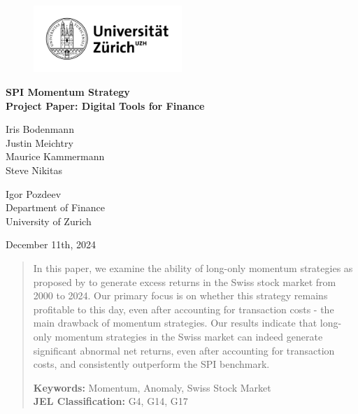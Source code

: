 \documentclass[a4paper,12pt]{article}
\begin{document}
	\begin{titlepage}
		\centering
		\begin{figure}[!h]
			\centering
			\includegraphics[width=0.5\textwidth]{Universität_Zürich_logo.png}
		\end{figure}
		\Large{\textbf{SPI Momentum Strategy \\ Project Paper: Digital Tools for Finance}\\}

		\vfill
		
		\large{Iris Bodenmann\\ Justin Meichtry\\ Maurice Kammermann \\ Steve Nikitas\\}
		
		\vfill
	
		\large{Igor Pozdeev\\Department of Finance\\ University of Zurich\\}

        \vfill
        \large{December 11th, 2024}
	
		\vfill
		\begin{abstract}
            In this paper, we examine the ability of long-only momentum strategies as proposed by \cite{jegatit1993} to generate excess returns in the Swiss stock market from 2000 to 2024. Our primary focus is on whether this strategy remains profitable to this day, even after accounting for transaction costs - the main drawback of momentum strategies. Our results indicate that long-only momentum strategies in the Swiss market can indeed generate significant abnormal net returns, even after accounting for transaction costs, and consistently outperform the SPI benchmark.  
			
			\vspace{2mm}
			
			\textbf{Keywords:} Momentum, Anomaly, Swiss Stock Market\\
            \textbf{JEL Classification:} G4, G14, G17
		\end{abstract}
		
		
	\end{titlepage}
    
\end{document}

